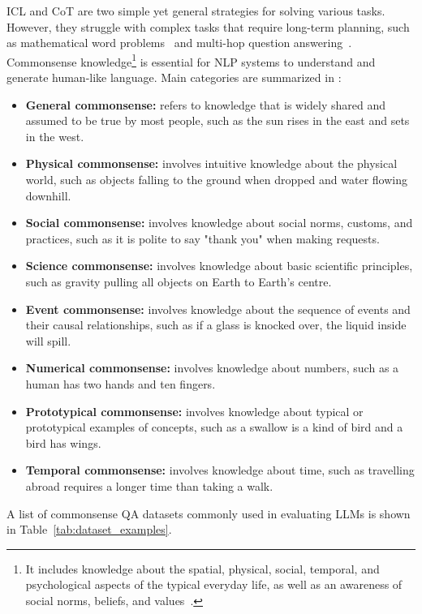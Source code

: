 ICL and CoT are two simple yet general strategies for solving various tasks.
However, they struggle with complex tasks that require long-term planning, such as mathematical word problems~\cite{qian2022limitations} and multi-hop question answering~\cite{bian2024chatgpt}.
Commonsense knowledge\footnote{It includes knowledge about the spatial, physical, social, temporal, and psychological aspects of the typical everyday life, as well as an awareness of social norms, beliefs, and values~\cite{liu2004conceptnet}.} is essential for NLP systems to understand and generate human-like language.
Main categories are summarized in \textcite{bian2024chatgpt}:
\begin{itemize}
	\item	\textbf{General commonsense:} refers to knowledge that is widely shared and assumed to be true by most people, such as the sun rises in the east and sets in the west.
	\item	\textbf{Physical commonsense:} involves intuitive knowledge about the physical world, such as objects falling to the ground when dropped and water flowing downhill.
	\item	\textbf{Social commonsense:} involves knowledge about social norms, customs, and practices, such as it is polite to say "thank you" when making requests.
	\item	\textbf{Science commonsense:} involves knowledge about basic scientific principles, such as gravity pulling all objects on Earth to Earth’s centre.
	\item	\textbf{Event commonsense:} involves knowledge about the sequence of events and their causal relationships, such as if a glass is knocked over, the liquid inside will spill.
	\item	\textbf{Numerical commonsense:} involves knowledge about numbers, such as a human has two hands and ten fingers.
	\item	\textbf{Prototypical commonsense:} involves knowledge about typical or prototypical examples of concepts, such as a swallow is a kind of bird and a bird has wings.
	\item	\textbf{Temporal commonsense:} involves knowledge about time, such as travelling abroad requires a longer time than taking a walk.
\end{itemize}
A list of commonsense QA datasets commonly used in evaluating LLMs is shown in Table~\ref{tab:dataset_examples}.
